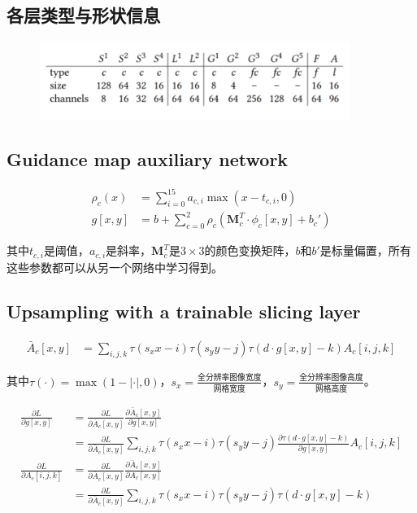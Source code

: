 \subsection{各层类型与形状信息}

\begin{figure}
\centering
\includegraphics[width=0.9\textwidth]{./images/DeepBilateralLearning02.png}
\caption{}
\end{figure}

\subsection{Guidance map auxiliary network}

$$
\begin{aligned}
\rho_c(x) &= \sum_{i=0}^{15}a_{c,i}\max(x-t_{c,i}, 0)\\
g[x,y] &= b + \sum_{c=0}^{2}\rho_c(\textbf{M}_c^T\cdot \phi_c[x,y]+ b_c')
\end{aligned}
$$

其中\(t_{c,i}\)是阈值，\(a_{c,i}\)是斜率，\(\textbf{M}_{c}^T\)是\(3\times 3\)的颜色变换矩阵，\(b\)和\(b'\)是标量偏置，所有这些参数都可以从另一个网络中学习得到。

\subsection{Upsampling with a trainable slicing layer}

$$
\begin{aligned}
\bar{A}_c[x,y] &= \sum_{i,j,k}\tau(s_x x - i)\tau(s_y y - j)\tau(d\cdot g[x,y]-k)A_{c}[i,j,k]
\end{aligned}
$$

其中\(\tau(\cdot)=\max(1-|\cdot|,0)\)，\(s_x=\frac{全分辨率图像宽度}{网格宽度}\)，\(s_y=\frac{全分辨率图像高度}{网格高度}\)。

$$
\begin{aligned}
\frac{\partial L}{\partial g[x,y]} &= \frac{\partial L}{\partial \bar{A}_c[x,y]}\frac{\partial \bar{A}_c[x,y]}{\partial g[x,y]} \\
&= \frac{\partial L}{\partial \bar{A}_c[x,y]} \sum_{i,j,k}\tau(s_x x - i)\tau(s_y y - j)\frac{\partial\tau(d\cdot g[x,y]-k)}{\partial g[x,y]}A_{c}[i,j,k]\\
\frac{\partial L}{\partial A_c[i,j,k]}&=\frac{\partial L}{\partial \bar{A}_c[x,y]}\frac{\partial \bar{A}_c[x,y]}{\partial A_c[x,y]}\\
&=\frac{\partial L}{\partial \bar{A}_c[x,y]}\sum_{i,j,k}\tau(s_x x - i)\tau(s_y y - j)\tau(d\cdot g[x,y]-k)
\end{aligned}
$$


